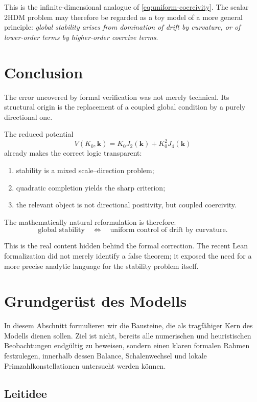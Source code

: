 \documentclass[11pt,a4paper]{article}
\newcommand{\kk}{\bm{k}}
\begin{document}
	This is the infinite-dimensional analogue of \eqref{eq:uniform-coercivity}. The scalar 2HDM problem may therefore be regarded as a toy model of a more general principle: \emph{global stability arises from domination of drift by curvature, or of lower-order terms by higher-order coercive terms}.
	
	\section{Conclusion}
	
	The error uncovered by formal verification was not merely technical. Its structural origin is the replacement of a coupled global condition by a purely directional one.
	
	The reduced potential
	\[
	V(K_0,\kk)=K_0J_2(\kk)+K_0^2J_4(\kk)
	\]
	already makes the correct logic transparent:
	\begin{enumerate}
		\item stability is a mixed scale--direction problem;
		\item quadratic completion yields the sharp criterion;
		\item the relevant object is not directional positivity, but coupled coercivity.
	\end{enumerate}
	
	The mathematically natural reformulation is therefore:
	\[
	\text{global stability}
	\quad \Longleftrightarrow \quad
	\text{uniform control of drift by curvature}.
	\]
	
	This is the real content hidden behind the formal correction. The recent Lean formalization did not merely identify a false theorem; it exposed the need for a more precise analytic language for the stability problem itself.
	
	\section{Grundgerüst des Modells}
	
	In diesem Abschnitt formulieren wir die Bausteine, die als tragfähiger Kern des Modells dienen sollen. Ziel ist nicht, bereits alle numerischen und heuristischen Beobachtungen endgültig zu beweisen, sondern einen klaren formalen Rahmen festzulegen, innerhalb dessen Balance, Schalenwechsel und lokale Primzahlkonstellationen untersucht werden können.
	
	\subsection{Leitidee}
	
\end{document}
